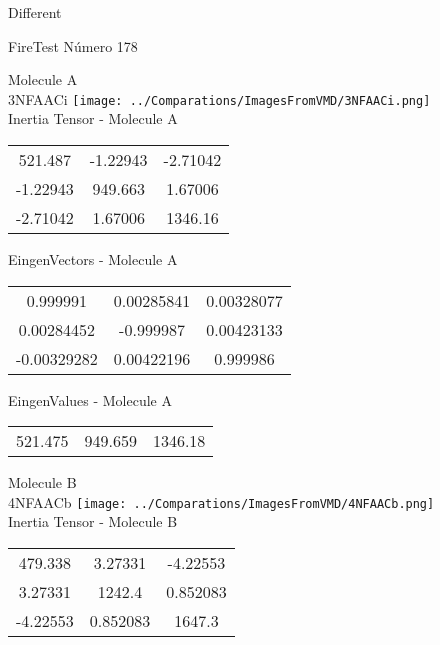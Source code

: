 \begin{center}
\vtab
\vtab
\textcolor{NavyBlue}{\Large Different}
\end{center}

 \newpage

\vtab[-2cm]
\begin{center}
{\large FireTest \tab Número 178}
\end{center}
\begin{multicols}{2}
\begin{center}

Molecule A \\ 
3NFAACi
\texttt{[image: ../Comparations/ImagesFromVMD/3NFAACi.png]}
\\
Inertia Tensor - Molecule A \\
\vtab

\begin{tabular}{|c c c|}
521.487	 & 	-1.22943	 & 	-2.71042	 \\
-1.22943	 & 	949.663	 & 	1.67006	 \\
-2.71042	 & 	1.67006	 & 	1346.16
\end{tabular}

\vtab
 EingenVectors - Molecule A     \\
\vtab
\begin{tabular}{|c c c|}
0.999991	 & 	0.00285841	 & 	0.00328077	 \\
0.00284452	 & 	-0.999987	 & 	0.00423133	 \\
-0.00329282	 & 	0.00422196	 & 	0.999986
\end{tabular}

\vtab
 EingenValues - Molecule A     \\
\vtab
\begin{tabular}{|c c c|}
521.475	 & 	949.659	 & 	1346.18	 \\
\end{tabular}
\columnbreak

Molecule B \\ 
4NFAACb
\texttt{[image: ../Comparations/ImagesFromVMD/4NFAACb.png]}
\\
Inertia Tensor - Molecule B \\
\vtab

\begin{tabular}{|c c c|}
479.338	 & 	3.27331	 & 	-4.22553	 \\
3.27331	 & 	1242.4	 & 	0.852083	 \\
-4.22553	 & 	0.852083	 & 	1647.3
\end{tabular}


\end{center}
\end{multicols}
